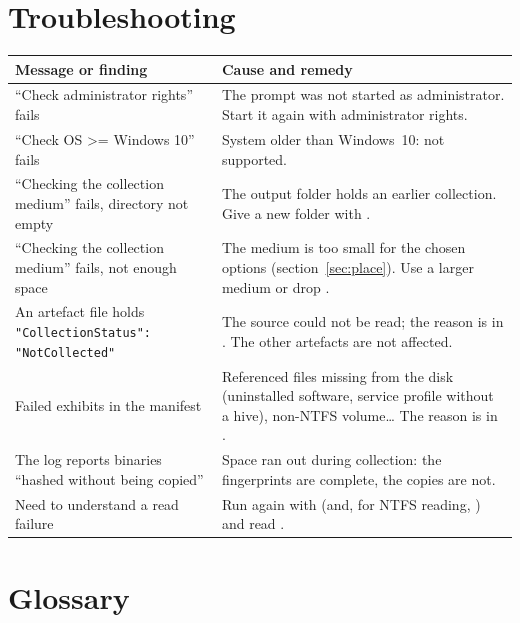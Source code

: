 \documentclass[11pt,a4paper,oneside]{report}
\begin{document}
\chapter{Troubleshooting}

\begin{longtable}{@{}L{5cm}L{9.4cm}@{}}
\toprule
\bfseries Message or finding & \bfseries Cause and remedy \\
\midrule
\endhead
``Check administrator rights'' fails & The prompt was not started as
  administrator. Start it again with administrator rights. \\
``Check OS >= Windows 10'' fails & System older than Windows~10: not
  supported. \\
``Checking the collection medium'' fails, directory not empty & The output
  folder holds an earlier collection. Give a new folder with . \\
``Checking the collection medium'' fails, not enough space & The medium is too
  small for the chosen options (section~\ref{sec:place}). Use a larger medium or
  drop . \\
An artefact file holds \texttt{"CollectionStatus": "NotCollected"} & The source
  could not be read; the reason is in . The other artefacts are not
  affected. \\
Failed exhibits in the manifest & Referenced files missing from the disk
  (uninstalled software, service profile without a hive), non-NTFS
  volume\ldots{} The reason is in . \\
The log reports binaries ``hashed without being copied'' & Space ran out during
  collection: the fingerprints are complete, the copies are not. \\
Need to understand a read failure & Run again with  (and, for
  NTFS reading, ) and read . \\
\bottomrule
\end{longtable}

\appendix

\chapter{Glossary}
\end{document}
